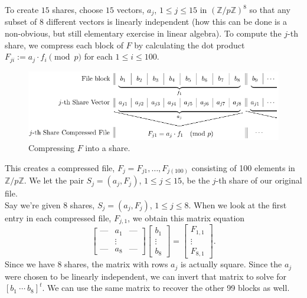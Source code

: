 \documentclass[12pt]{article}
\newcommand{\integers}{\mathbb{Z}}
\begin{document}
\noindent To create $15$ shares, choose $15$ vectors, $a_j$, $1\leq j\leq 15$ in $(\integers/p\integers)^8$ so that any subset of $8$ different vectors is linearly independent (how this can be done is a non-obvious, but still elementary exercise in linear algebra). To compute the $j$-th share, we compress each block of $F$ by calculating the dot product $F_{ji} := a_j\cdot f_i\pmod{p}$ for each $1\leq i\leq 100$.

\begin{figure}[h]
 	\centering
 		\includegraphics[scale=.7]{rabin_compression.png}
 	\caption{Compressing $F$ into a share.}
\end{figure}

\noindent This creates a compressed file, $F_j = F_{j1}, \ldots, F_{j(100)}$ consisting of 100 elements in $\integers/p\integers$. We let the pair $S_j = (a_j, F_j)$, $1\leq j\leq 15$, be the $j$-th share of our original file.\\

\noindent Say we're given 8 shares, $S_j = (a_j, F_j)$, $1\leq j\leq 8$. When we look at the first entry in each compressed file, $F_{j,1}$, we obtain this matrix equation
\[
\begin{bmatrix}
	\text{---} & a_1 & \text{---}\\
	&\vdots &\\
	\text{---} & a_8 & \text{---}
\end{bmatrix}
\begin{bmatrix}
	b_1\\
	\vdots\\
	b_8
\end{bmatrix} = 
\begin{bmatrix}
	F_{1,1}\\
	\vdots\\
	F_{8,1}
\end{bmatrix}.
\]
Since we have 8 shares, the matrix with rows $a_j$ is actually square. Since the $a_j$ were chosen to be linearly independent, we can invert that matrix to solve for $[b_1\ \cdots\ b_8]^t$. We can use the same matrix to recover the other 99 blocks as well. 
\end{document}
